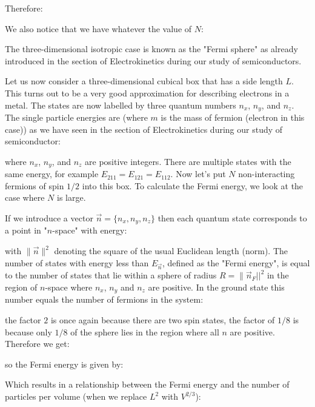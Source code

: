 	Therefore:
	
	We also notice that we have whatever the value of $N$:
	
	The three-dimensional isotropic case is known as the "Fermi sphere" as already introduced in the section of Electrokinetics during our study of semiconductors.
	
	Let us now consider a three-dimensional cubical box that has a side length $L$. This turns out to be a very good approximation for describing electrons in a metal. The states are now labelled by three quantum numbers $n_x$, $n_y$, and $n_z$. The single particle energies are (where $m$ is the mass of fermion (electron in this case)) as we have seen in the section of Electrokinetics during our study of semiconductor:
	
	where $n_x$, $n_y$, and $n_z$ are positive integers. There are multiple states with the same energy, for example $E_{211}=E_{121}=E_{112}$. Now let's put $N$ non-interacting fermions of spin $1/2$ into this box. To calculate the Fermi energy, we look at the case where $N$ is large.

	If we introduce a vector $\vec{n}=\{n_{x},n_{y},n_{z}\}$ then each quantum state corresponds to a point in "$n$-space" with energy:
	
	with $\|\vec{n}\|^2$  denoting the square of the usual Euclidean length (norm). The number of states with energy less than  $E_{\vec{n}}$, defined as the "Fermi energy", is equal to the number of states that lie within a sphere of radius $R=\|\vec{n}_F||^2$ in the region of $n$-space where $n_x$, $n_y$ and $n_z$ are positive. In the ground state this number equals the number of fermions in the system:
	
	the factor $2$ is once again because there are two spin states, the factor of $1/8$ is because only $1/8$ of the sphere lies in the region where all $n$ are positive. Therefore we get:
	
	so the Fermi energy is given by:
	
	Which results in a relationship between the Fermi energy and the number of particles per volume (when we replace $L^2$ with $V^{2/3}$):
	
